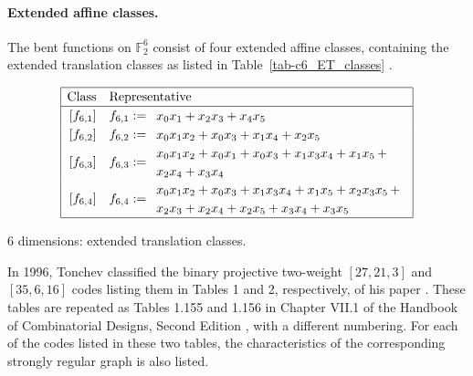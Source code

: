 \documentclass[12pt,a4paper]{article}
\newcommand{\mb}[1]{\mathbb{#1}}
\newcommand{\F}{\mb{F}}
\begin{document}
\paragraph*{Extended affine classes.}
%
The bent functions on $\F_2^6$ consist of four
extended affine classes, containing the extended translation classes as listed in Table~\ref{tab-c6_ET_classes}
\cite[p. 303]{Rot76} \cite[Section 7.2]{Tok15bent}.
\begin{table}[!bhpt] %
\small{
\begin{align*}
\def\arraystretch{1.2}
\begin{array}{|cl|}
\hline
\text{Class} &
\text{Representative}
\\
\hline
\,[f_{6,1}] & f_{6,1} :=
\begin{array}{l}
x_{0} x_{1} + x_{2} x_{3} + x_{4} x_{5}
\end{array}
\\
\,[f_{6,2}] & f_{6,2} :=
\begin{array}{l}
x_{0} x_{1} x_{2} + x_{0} x_{3} + x_{1} x_{4} + x_{2} x_{5}
\end{array}
\\
\,[f_{6,3}] & f_{6,3} :=
\begin{array}{l}
x_{0} x_{1} x_{2} + x_{0} x_{1} + x_{0} x_{3} + x_{1} x_{3} x_{4} + x_{1} x_{5}\, +
\\
x_{2} x_{4} + x_{3} x_{4}
\end{array}
\\
\,[f_{6,4}] & f_{6,4} :=
\begin{array}{l}
x_{0} x_{1} x_{2} + x_{0} x_{3} + x_{1} x_{3} x_{4} + x_{1} x_{5} + x_{2} x_{3} x_{5}\, +
\\
x_{2} x_{3} + x_{2} x_{4} + x_{2} x_{5} + x_{3} x_{4} + x_{3} x_{5}
\end{array}
\\
\hline
\end{array}
\end{align*}
}
\caption{6 dimensions: extended translation classes.}
\label{tab-c6_ET_classes}
\end{table}

In 1996, Tonchev classified the binary projective two-weight $[27,21,3]$ and $[35,6,16]$ codes
listing them in Tables 1 and 2, respectively, of his paper \cite{Ton96uniformly}.
These tables are repeated as Tables 1.155 and 1.156 in Chapter VII.1 of the Handbook of
Combinatorial Designs, Second Edition \cite{Ton07codes},
with a different numbering.
For each of the codes listed in these two tables, the characteristics of the corresponding
strongly regular graph is also listed.
\end{document}
